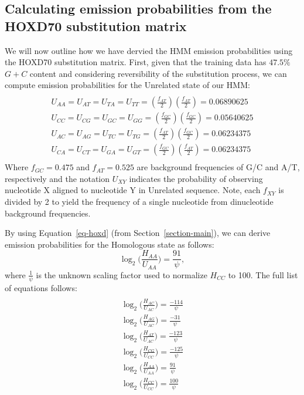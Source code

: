 \thispagestyle{empty}
\subsection*{Calculating emission probabilities from the HOXD70 substitution matrix}
We will now outline how we have dervied the HMM emission probabilities using the HOXD70 substitution matrix. First, given that the training
data has $47.5\%$~$G+C$ content and considering reversibility of the substitution process, we can compute emission probabilities for the Unrelated state
of our HMM:
\begin{multline}\\
U_{AA}=U_{AT}=U_{TA}=U_{TT}=(\frac{f_{AT}}{2})(\frac{f_{AT}}{2})
= 0.06890625 \\
U_{CC}=U_{CG}=U_{GC}=U_{GG}=(\frac{f_{GC}}{2})(\frac{f_{GC}}{2}) =
0.05640625 \\
U_{AC}=U_{AG}=U_{TC}=U_{TG}=(\frac{f_{AT}}{2})(\frac{f_{GC}}{2}) =
0.06234375 \\
U_{CA}=U_{CT}=U_{GA}=U_{GT}=(\frac{f_{GC}}{2})(\frac{f_{AT}}{2}) =
0.06234375 \\
\label{eq-ff}
\end{multline}
Where $f_{GC}=0.475$ and $f_{AT}=0.525$ are background frequencies of
G/C and A/T, respectively and the notation $U_{XY}$ indicates the probability of observing nucleotide X aligned to
nucleotide Y in Unrelated sequence.    Note, each $f_{XY}$ is divided by 2 to yield the frequency of a single nucleotide from dinucleotide background frequencies.

By using Equation~\ref{eq-hoxd} (from Section~\ref{section-main}), we can derive emission probabilities for
the Homologous state as follows:
\begin{equation}
\log_{2}\bigg(\frac{H_{AA}}{U_{AA}}\bigg) = \frac{91}{\psi},
\end{equation}
where $\frac{1}{\psi}$ is the unknown scaling factor used to normalize $H_{CC}$ to 100. The full list of equations follows:
\begin{multline}\\
\log_{2}\bigg(\frac{H_{AC}}{U_{AC}}\bigg) = \frac{-114}{\psi}\\
\log_{2}\bigg(\frac{H_{AG}}{U_{AC}}\bigg) = \frac{-31}{\psi}\\
\log_{2}\bigg(\frac{H_{AT}}{U_{AC}}\bigg) = \frac{-123}{\psi}\\
\log_{2}\bigg(\frac{H_{CG}}{U_{CC}}\bigg) = \frac{-125}{\psi}\\
\log_{2}\bigg(\frac{H_{AA}}{U_{AA}}\bigg) = \frac{91}{\psi}\\
\log_{2}\bigg(\frac{H_{CC}}{U_{CC}}\bigg) = \frac{100}{\psi}\\
\end{multline}

